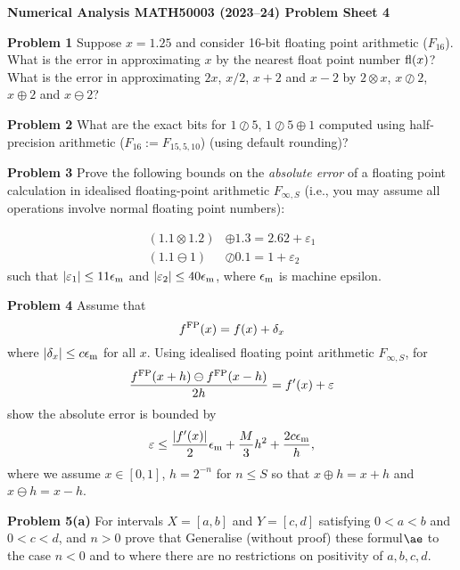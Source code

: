 \documentclass[12pt,a4paper]{article}
\def\endash{–}
\begin{document}
\textbf{Numerical Analysis MATH50003 (2023\ensuremath{\endash}24) Problem Sheet 4}

\textbf{Problem 1} Suppose $x = 1.25$ and consider 16-bit floating point arithmetic ($F_{16}$). What is the error in approximating $x$ by the nearest float point number ${\rm fl}(x)$? What is the error in approximating $2x$, $x/2$, $x + 2$ and $x - 2$ by $2 \otimes x$, $x \oslash 2$, $x \ensuremath{\oplus} 2$ and $x \ominus 2$?

\textbf{Problem 2} What are the exact bits for $1 \ensuremath{\oslash} 5$, $1 \ensuremath{\oslash} 5 \ensuremath{\oplus} 1$ computed using  half-precision arithmetic ($F_{16} := F_{15,5,10}$) (using default rounding)?

\textbf{Problem 3} Prove the following bounds on the \emph{absolute error} of a floating point calculation in idealised floating-point arithmetic $F_{\ensuremath{\infty},S}$ (i.e., you may assume all operations involve normal floating point numbers):


\begin{align*}
(1.1 \ensuremath{\otimes} 1.2) &\ensuremath{\oplus} 1.3 = 2.62 + \ensuremath{\varepsilon}_1 \\
(1.1 \ensuremath{\ominus} 1) & \ensuremath{\oslash} 0.1 = 1 + \ensuremath{\varepsilon}_2
\end{align*}
such that $|\ensuremath{\varepsilon}_1| \ensuremath{\leq} 11 \ensuremath{\epsilon}_{\rm m}$ and $|\ensuremath{\varepsilon}_2| \ensuremath{\leq} 40 \ensuremath{\epsilon}_{\rm m}$, where $\ensuremath{\epsilon}_{\rm m}$ is machine epsilon.

\textbf{Problem 4} Assume that
\[
f^{\rm FP}(x) = f(x) + \ensuremath{\delta}_x
\]
where $|\ensuremath{\delta}_x| \ensuremath{\leq} c \ensuremath{\epsilon}_{\rm m}$ for all $x$. Using idealised floating point arithmetic $F_{\ensuremath{\infty},S}$, for
\[
{f^{\rm FP}(x+h) \ensuremath{\ominus} f^{\rm FP}(x-h) \over  2h} = f'(x) + \ensuremath{\varepsilon}
\]
show the absolute error is bounded by
\[
\ensuremath{\varepsilon} \ensuremath{\leq} {|f'(x)| \over 2} \ensuremath{\epsilon}_{\rm m} + {M \over 3} h^2 + {2 c \ensuremath{\epsilon}_{\rm m} \over h},
\]
where we assume $x \ensuremath{\in} [0,1]$, $h = 2^{-n}$ for $n \ensuremath{\leq} S$ so that $x \ensuremath{\oplus} h  = x+ h$ and $x \ensuremath{\ominus} h = x-h$.

\textbf{Problem 5(a)} For intervals  $X = [a,b]$ and $Y = [c,d]$ satisfying $0 < a < b$ and $0 < c < d$, and $n > 0$ prove that
Generalise (without proof) these formul\ensuremath{\ae} to the case $n < 0$ and to where there are no restrictions on positivity of $a,b,c,d$. 
\end{document}

